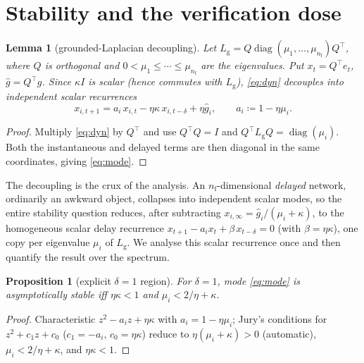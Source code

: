 \documentclass[11pt]{article}
\newtheorem{proposition}{Proposition}
\newtheorem{lemma}{Lemma}
\theoremstyle{definition}
\newcommand{\Lg}{L_{\mathrm g}}
\DeclareMathOperator{\diag}{diag}
\begin{document}
\section{Stability and the verification dose}\label{sec:stab}

\begin{lemma}[grounded-Laplacian decoupling]\label{lem:decouple}
Let $\Lg = Q\diag(\mu_1,\dots,\mu_{n_{\mathrm f}})Q^\top$, where $Q$ is orthogonal and
$0<\mu_1\le\cdots\le\mu_{n_{\mathrm f}}$ are the eigenvalues.
Put $x_t = Q^\top e_t$, $\hat g=Q^\top g$. Since $\kappa I$ is scalar (hence commutes with $\Lg$),
\eqref{eq:dyn} decouples into independent scalar recurrences
\begin{equation}\label{eq:mode}
  x_{i,t+1} = a_i\,x_{i,t} - \eta\kappa\, x_{i,t-\delta} + \eta\hat g_i,
  \qquad a_i \coloneqq 1-\eta\mu_i .
\end{equation}
\end{lemma}
\begin{proof}
Multiply \eqref{eq:dyn} by $Q^\top$ and use $Q^\top Q=I$ and
$Q^\top\Lg Q=\diag(\mu_i)$. Both the instantaneous and delayed terms are then diagonal
in the same coordinates, giving \eqref{eq:mode}.
\end{proof}

The decoupling is the crux of the analysis. An $n_{\mathrm f}$-dimensional \emph{delayed} network,
ordinarily an awkward object, collapses into independent scalar modes, so the entire stability
question reduces, after subtracting $x_{i,\infty}=\hat g_i/(\mu_i+\kappa)$, to the homogeneous
scalar delay recurrence $x_{t+1}-a_i x_t+\beta\,x_{t-\delta}=0$ (with
$\beta=\eta\kappa$), one copy per eigenvalue $\mu_i$ of $\Lg$. We analyse this scalar recurrence once
and then quantify the result over the spectrum.

\begin{proposition}[explicit $\delta=1$ region]\label{prop:delta1}
For $\delta=1$, mode \eqref{eq:mode} is asymptotically stable iff
$\eta\kappa<1$ and $\mu_i<2/\eta+\kappa$.
\end{proposition}
\begin{proof}
Characteristic $z^2-a_i z+\eta\kappa$ with $a_i=1-\eta\mu_i$; Jury's conditions for
$z^2+c_1z+c_0$ ($c_1=-a_i$, $c_0=\eta\kappa$) reduce to $\eta(\mu_i+\kappa)>0$ (automatic),
$\mu_i<2/\eta+\kappa$, and $\eta\kappa<1$.
\end{proof}
\end{document}
